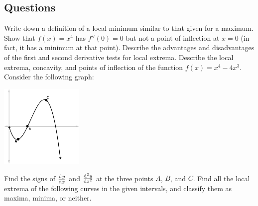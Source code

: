 \subsection*{Questions}
\begin{questions}
  \questioA Write down a definition of a local minimum similar to that given for a maximum.
  \questioA Show that $ f(x) = x^4 $ has $ f''(0) = 0 $ but not a point of inflection at $ x = 0 $ (in fact, it has a minimum at that point).
  \questioA Describe the advantages and disadvantages of the first and second derivative tests for local extrema.
  \questioM Describe the local extrema, concavity, and points of inflection of the function $ f(x) = x^4 - 4x^3 $.
  \questioA Consider the following graph:
            \begin{center}
              \includegraphics[width=0.3\textwidth]{curvature}
            \end{center}
            Find the signs of $ \od{y}{x} $ and $ \od[2]{y}{x} $ at the three points $ A $, $ B $, and $ C $.
  \questioM Find all the local extrema of the following curves in the given intervals, and classify them as maxima, minima, or neither.
\end{questions}
